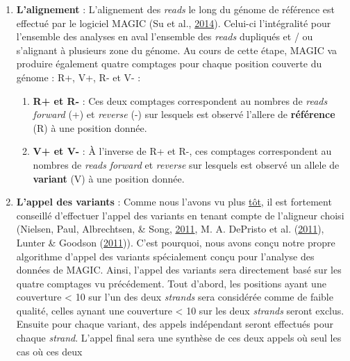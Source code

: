 \documentclass[12pt,twoside]{reedthesis}
\providecommand{\tightlist}{%
  \setlength{\itemsep}{0pt}\setlength{\parskip}{0pt}}
\theoremstyle{definition}
\theoremstyle{definition}
\theoremstyle{remark}
\begin{document}
  \begin{enumerate}
  \def\labelenumi{\arabic{enumi}.}
  \tightlist
  \item
    \textbf{L'alignement} : L'alignement des \emph{reads} le long du
    génome de référence est effectué par le logiciel MAGIC (Su et al.,
    \protect\hyperlink{ref-Su2014}{2014}). Celui-ci l'intégralité pour
    l'ensemble des analyses en aval l'ensemble des \emph{reads} dupliqués
    et / ou s'alignant à plusieurs zone du génome. Au cours de cette
    étape, MAGIC va produire également quatre comptages pour chaque
    position couverte du génome : R+, V+, R- et V- :
  
    \begin{enumerate}
    \def\labelenumii{\alph{enumii}.}
    \tightlist
    \item
      \textbf{R+ et R-} : Ces deux comptages correspondent au nombres de
      \emph{reads} \emph{forward} (+) et \emph{reverse} (-) sur lesquels
      est observé l'allere de \textbf{référence} (R) à une position
      donnée.\\
    \item
      \textbf{V+ et V-} : À l'inverse de R+ et R-, ces comptages
      correspondent au nombres de \emph{reads} \emph{forward} et
      \emph{reverse} sur lesquels est observé un allele de
      \textbf{variant} (V) à une position donnée.\\
    \end{enumerate}
  \item
    \textbf{L'appel des variants} : Comme nous l'avons vu plus
    \protect\hyperlink{varcall}{tôt}, il est fortement conseillé
    d'effectuer l'appel des variants en tenant compte de l'aligneur choisi
    (Nielsen, Paul, Albrechtsen, \& Song,
    \protect\hyperlink{ref-Nielsen2011}{2011}, M. A. DePristo et al.
    (\protect\hyperlink{ref-DePristo2011}{2011}), Lunter \& Goodson
    (\protect\hyperlink{ref-Lunter2011}{2011})). C'est pourquoi, nous
    avons conçu notre propre algorithme d'appel des variants spécialement
    conçu pour l'analyse des données de MAGIC. Ainsi, l'appel des variants
    sera directement basé sur les quatre comptages vu précédement. Tout
    d'abord, les positions ayant une couverture \textless{} 10 sur l'un
    des deux \emph{strands} sera considérée comme de faible qualité,
    celles aynant une couverture \textless{} 10 sur les deux
    \emph{strands} seront exclus. Ensuite pour chaque variant, des appels
    indépendant seront effectués pour chaque \emph{strand}. L'appel final
    sera une synthèse de ces deux appels où seul les cas où ces deux

\end{enumerate}
\end{document}
